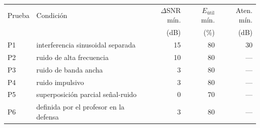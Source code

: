 \begin{tabular}{llrrr}
\toprule
Prueba & Condición & $\Delta$SNR mín. & $E_{\text{útil}}$ mín. & Aten. mín. \\
 & & (dB) & (\%) & (dB) \\
\midrule
P1 & interferencia sinusoidal separada & 15 & 80 & 30 \\
P2 & ruido de alta frecuencia & 10 & 80 & --- \\
P3 & ruido de banda ancha & 3 & 80 & --- \\
P4 & ruido impulsivo & 3 & 80 & --- \\
P5 & superposición parcial señal-ruido & 0 & 70 & --- \\
P6 & definida por el profesor en la defensa & 3 & 80 & --- \\
\bottomrule
\end{tabular}

